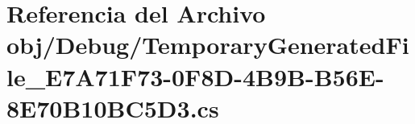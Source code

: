 \hypertarget{Debug_2TemporaryGeneratedFile__E7A71F73-0F8D-4B9B-B56E-8E70B10BC5D3_8cs}{}\section{Referencia del Archivo obj/\+Debug/\+Temporary\+Generated\+File\+\_\+\+E7\+A71\+F73-\/0\+F8\+D-\/4\+B9\+B-\/\+B56\+E-\/8\+E70\+B10\+B\+C5\+D3.cs}
\label{Debug_2TemporaryGeneratedFile__E7A71F73-0F8D-4B9B-B56E-8E70B10BC5D3_8cs}
